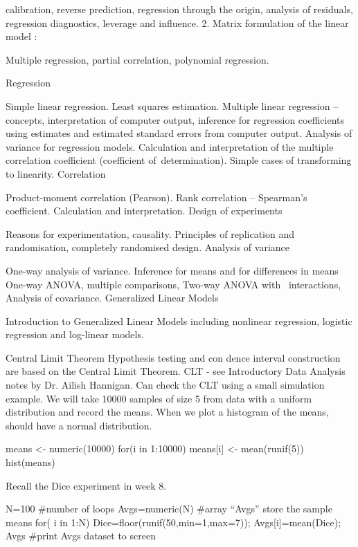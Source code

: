calibration, reverse prediction, regression through the origin, analysis of residuals, regression diagnostics, leverage and influence.
2. Matrix formulation of the linear model :

Multiple regression, partial correlation, polynomial regression.

Regression

Simple linear regression. Least squares estimation.
Multiple linear regression – concepts, interpretation of computer output, inference for regression coefficients using estimates and estimated standard errors from computer output.
Analysis of variance for regression models.
Calculation and interpretation of the multiple correlation coefficient (coefficient of determination).
Simple cases of transforming to linearity.
Correlation

Product-moment correlation (Pearson).
Rank correlation – Spearman’s coefficient.
Calculation and interpretation.
Design of experiments

Reasons for experimentation, causality.
Principles of replication and randomisation, completely randomised design.
Analysis of variance

One-way analysis of variance.
Inference for means and for differences in means
One-way ANOVA, multiple comparisons,
Two-way ANOVA with  interactions,
Analysis of covariance.
Generalized Linear Models

Introduction to Generalized Linear Models including nonlinear regression, logistic regression and log-linear models.



 
Central Limit Theorem
Hypothesis testing and con dence interval construction are based on the Central Limit Theorem.
CLT - see Introductory Data Analysis notes by Dr. Ailish Hannigan.
Can check the CLT using a small simulation example.
We will take 10000 samples of size 5 from data with a uniform distribution and record the means.
When we plot a histogram of the means, should have a normal distribution.
 
means <- numeric(10000)
for(i in 1:10000){
means[i] <- mean(runif(5))
}
hist(means)
 

Recall the Dice experiment in week 8.
 
N=100                                         #number of loops
Avgs=numeric(N)                       #array “Avgs” store the sample means
for( i in 1:N)
              {              Dice=floor(runif(50,min=1,max=7));              Avgs[i]=mean(Dice);
              }
Avgs                                         #print Avgs dataset to screen
 
